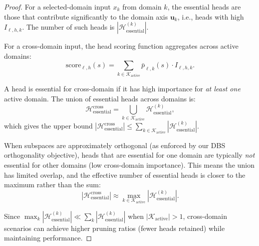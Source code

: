 \begin{proof}
For a selected-domain input $x_k$ from domain $k$, the essential heads are those that contribute significantly to the domain axis $\mathbf{u}_k$, i.e., heads with high $I_{\ell,h,k}$.
The number of such heads is $|\mathcal{H}_{\mathrm{essential}}^{(k)}|$.

For a cross-domain input, the head scoring function aggregates across active domains:
\begin{equation}
\mathrm{score}_{\ell,h}(s) = \sum_{k \in \mathcal{K}_{\mathrm{active}}} \bar{p}_{\ell,k}(s) \cdot I_{\ell,h,k}.
\end{equation}

A head is essential for cross-domain if it has high importance for \emph{at least one} active domain.
The union of essential heads across domains is:
\begin{equation}
\mathcal{H}_{\mathrm{essential}}^{\mathrm{cross}} = \bigcup_{k \in \mathcal{K}_{\mathrm{active}}} \mathcal{H}_{\mathrm{essential}}^{(k)},
\end{equation}
which gives the upper bound $|\mathcal{H}_{\mathrm{essential}}^{\mathrm{cross}}| \leq \sum_{k \in \mathcal{K}_{\mathrm{active}}} |\mathcal{H}_{\mathrm{essential}}^{(k)}|$.

When subspaces are approximately orthogonal (as enforced by our DBS orthogonality objective), heads that are essential for one domain are typically \emph{not} essential for other domains (low cross-domain importance).
This means the union has limited overlap, and the effective number of essential heads is closer to the maximum rather than the sum:
\begin{equation}
|\mathcal{H}_{\mathrm{essential}}^{\mathrm{cross}}| \approx \max_{k \in \mathcal{K}_{\mathrm{active}}} |\mathcal{H}_{\mathrm{essential}}^{(k)}|.
\end{equation}

Since $\max_{k} |\mathcal{H}_{\mathrm{essential}}^{(k)}| \ll \sum_{k} |\mathcal{H}_{\mathrm{essential}}^{(k)}|$ when $|\mathcal{K}_{\mathrm{active}}| > 1$, cross-domain scenarios can achieve higher pruning ratios (fewer heads retained) while maintaining performance.
\end{proof}

